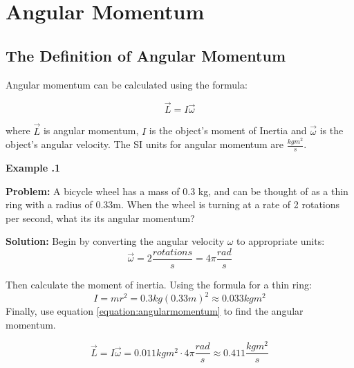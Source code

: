 	\newpage
	\section{Angular Momentum} \label{angularmomentum} 
	\subsection{The Definition of Angular Momentum}
	Angular momentum can be calculated using the formula: 
	 	\begin{mdframed}[backgroundcolor=orange!20!white]
		\begin{equation}
		\vec{L} = I \vec{\omega}
		\label{equation:angularmomentum}
				\end{equation}
	\end{mdframed}
where $\vec{L}$ is angular momentum, $I$ is the object's moment of Inertia and $\vec{\omega}$ is the object's angular velocity.  The SI units for angular momentum are  $\frac{kg m^2} {s} $.


\begin{mdframed}[backgroundcolor=blue!10!white]
	\begin{center}
		
		
		\textbf{Example \thesection.1}	
	\end{center}
	\vspace{0.1in}
	\textbf{Problem:} A bicycle wheel has a mass of 0.3 kg, and can be thought of as a thin ring with a radius of 0.33m. When the wheel is turning at a rate of 2 rotations per second, what its its angular momentum?
	\vspace{0.1in}
	
	\textbf{Solution:} 
	Begin by converting the angular velocity $\omega$ to appropriate units:
	\begin{equation*}
	\vec{\omega} = 2 \frac{rotations}{s} = 4\pi \frac{rad}{s}
	\end{equation*}
	
	Then calculate the moment of inertia.  Using the formula for a thin ring: 
	\begin{equation*}
	I  = mr^2 = 0.3 kg  (0.33m)^2 \approx 0.033 kg m^2
	\end{equation*}
	Finally, use equation \ref{equation:angularmomentum} to find the angular momentum. 
	
	\begin{equation*}
	\vec{L}  =  I \vec{\omega} = 0.011 kg m^2 \cdot 4\pi \frac{rad}{s} \approx \boxed{0.411 \frac{kg m^2}{s}}
	\end{equation*}
	
	
	
\end{mdframed}


